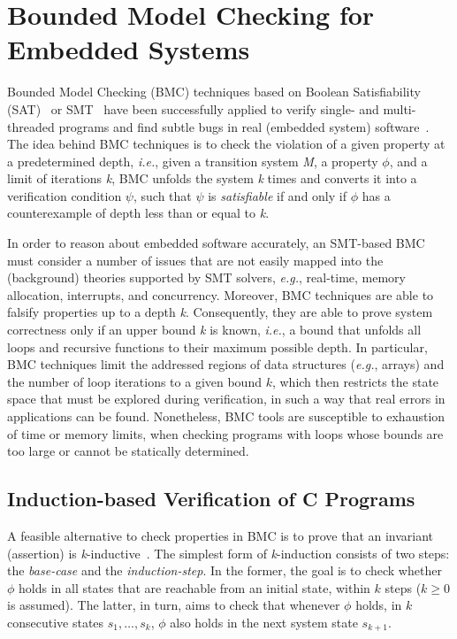 \documentclass{acm_sen_article}
\begin{document}
\section{Bounded Model Checking for Embedded Systems}

Bounded Model Checking (BMC) techniques based on Boolean Satisfiability (SAT)~\cite{handbook09} or SMT~\cite{BarrettSST09} have been successfully applied to verify single- and multi-threaded programs and find subtle bugs in real (embedded system) software~\cite{Clarke04,MerzFS12,CordeiroF11,Ivancic05,Cordeiro12}. The idea behind BMC techniques is to check the violation of a given property at a predetermined depth, {\it i.e.}, given a transition system \textit{M}, a property $ \phi $, and a limit of iterations \textit{k}, BMC unfolds the system \textit{k} times and converts it into a verification condition $ \psi $, such that $\psi$ is \textit{satisfiable} if and only if $\phi$ has a counterexample of depth
less than or equal to \textit{k}.

In order to reason about embedded software accurately, an SMT-based BMC must consider a number of issues that are not easily mapped into the (background) theories supported by SMT solvers, {\it e.g.}, real-time, memory allocation, interrupts, and concurrency. Moreover, BMC techniques are able to falsify properties up to a depth \textit{k}. Consequently, they are able to prove system correctness only if an upper bound \textit{k} is known, {\it i.e.}, a bound that unfolds all loops and recursive functions to their maximum possible depth. In particular, BMC techniques limit the addressed regions of data structures ({\it e.g.}, arrays) and the number of loop iterations to a given bound $k$, which then restricts the state space that must be explored during verification, in such a way that real errors in applications \cite{Clarke04,MerzFS12,Ivancic05,Cordeiro12} can be found. Nonetheless, BMC tools are susceptible to exhaustion of time or memory limits, when checking programs with loops whose bounds are too large or cannot be statically determined.  

\subsection{Induction-based Verification of C Programs}

A feasible alternative to check properties in BMC is to prove that an invariant (assertion) is \textit{k}-inductive~\cite{EenS03,Sheera00}. 
The simplest form of \textit{k}-induction consists of two steps: the \textit{base-case} and the \textit{induction-step}. In the former, the goal is to check whether $\phi$ holds in all states that are reachable from an initial state, within $k$ steps ($k \geq 0$ is assumed). The latter, in turn, aims to check that whenever $\phi$ holds, in $k$ consecutive states $s_1,\ldots,s_k$, $\phi$ also holds in the next system state $s_{k+1}$. 
\end{document}
